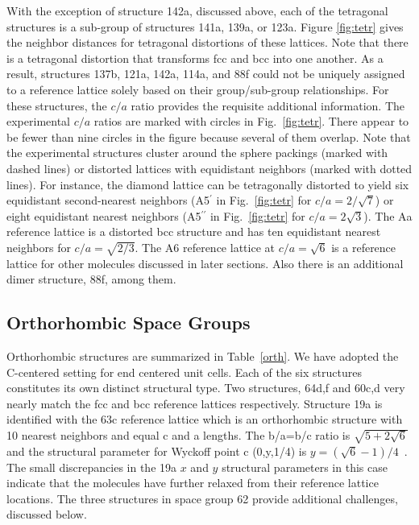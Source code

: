 \documentclass[preprint]{revtex4}              %
\begin{document}
With the exception of structure 142a, discussed above, each of the
tetragonal structures is a sub-group of structures 141a, 139a, or
123a. Figure \ref{fig:tetr} gives the neighbor distances for
tetragonal distortions of these lattices.  Note that there is a
tetragonal distortion that transforms fcc and bcc into one another.
As a result, structures 137b, 121a, 142a, 114a, and 88f could not be
uniquely assigned to a reference lattice solely based on their
group/sub-group relationships.  For these structures, the $c/a$
ratio provides the requisite additional information.  The
experimental $c/a$ ratios are marked with circles in
Fig.~\ref{fig:tetr}. There appear to be fewer than nine circles in
the figure because several of them overlap. Note that the
experimental structures cluster around the sphere packings (marked
with dashed lines) or distorted lattices with equidistant neighbors
(marked with dotted lines). For instance, the diamond lattice can be
tetragonally distorted to yield six equidistant second-nearest
neighbors (A5$^\prime$ in Fig.\ \ref{fig:tetr} for $c/a=2/\sqrt{7}$)
or eight equidistant nearest neighbors (A5$^{\prime\prime}$ in Fig.\
\ref{fig:tetr} for $c/a=2\sqrt{3}$). The Aa reference lattice is a
distorted bcc structure and has ten equidistant nearest neighbors
for $c/a=\sqrt{2/3}$. The A6 reference lattice at $c/a=\sqrt{6}$ is
a reference lattice for other molecules discussed in later sections.
Also there is an additional dimer structure, 88f, among them.

\subsection{Orthorhombic Space Groups}

Orthorhombic structures are summarized in Table~\ref{orth}. We have
adopted the C-centered setting for end centered unit cells. Each of
the six structures constitutes its own distinct structural type. Two
structures, 64d,f and 60c,d very nearly match the fcc and bcc
reference lattices respectively. Structure 19a is identified with
the 63c reference lattice which is an orthorhombic structure with 10
nearest neighbors and equal c and a lengths. The b/a=b/c ratio is
$\sqrt{5+2\sqrt{6}}$ and the structural parameter for Wyckoff point
c (0,y,1/4) is $y=(\sqrt{6}-1)/4$~\cite{mcclurg}. The small discrepancies in the
19a $x$ and $y$ structural parameters in this case indicate that the
molecules have further relaxed from their reference lattice
locations.  The three structures in space group 62 provide
additional challenges, discussed below.
\end{document}
